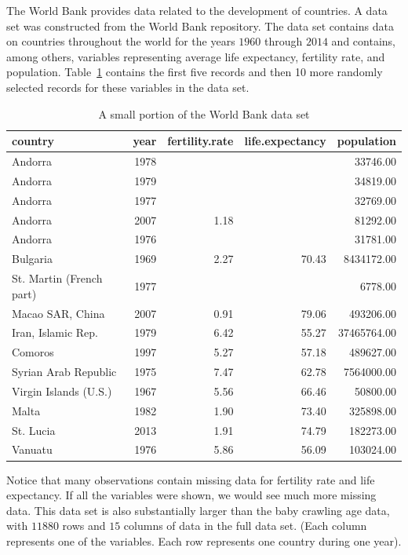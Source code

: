 \documentclass[12pt,oneside]{book}\usepackage[]{graphicx}\usepackage[]{color}
\begin{document}
The World Bank provides data related to the development of countries. A data set was constructed from the World Bank repository. The data set contains data on countries throughout the world for the years $1960$ through $2014$  and contains, among others, variables representing average life expectancy, fertility rate, and population. Table~\ref{TABLE:WORLDBANK} contains the first five records and then 10 more randomly selected records for these variables in the data set.
\begin{table}[ht]
\centering
\begin{tabular}{lrrrr}
  \hline
country & year & fertility.rate & life.expectancy & population \\ 
  \hline
Andorra & 1978 &  &  & 33746.00 \\ 
  Andorra & 1979 &  &  & 34819.00 \\ 
  Andorra & 1977 &  &  & 32769.00 \\ 
  Andorra & 2007 & 1.18 &  & 81292.00 \\ 
  Andorra & 1976 &  &  & 31781.00 \\ 
  Bulgaria & 1969 & 2.27 & 70.43 & 8434172.00 \\ 
  St. Martin (French part) & 1977 &  &  & 6778.00 \\ 
  Macao SAR, China & 2007 & 0.91 & 79.06 & 493206.00 \\ 
  Iran, Islamic Rep. & 1979 & 6.42 & 55.27 & 37465764.00 \\ 
  Comoros & 1997 & 5.27 & 57.18 & 489627.00 \\ 
  Syrian Arab Republic & 1975 & 7.47 & 62.78 & 7564000.00 \\ 
  Virgin Islands (U.S.) & 1967 & 5.56 & 66.46 & 50800.00 \\ 
  Malta & 1982 & 1.90 & 73.40 & 325898.00 \\ 
  St. Lucia & 2013 & 1.91 & 74.79 & 182273.00 \\ 
  Vanuatu & 1976 & 5.86 & 56.09 & 103024.00 \\ 
   \hline
\end{tabular}
\caption{A small portion of the World Bank data set} 
\label{TABLE:WORLDBANK}
\end{table}

Notice that many observations contain missing data for fertility rate and life expectancy. If all the variables were shown, we would see much more missing data.  This data set is also substantially larger than the baby crawling age data, with $11880$ rows and $15$ columns of data in the full data set. (Each column represents one of the variables. Each row represents one country during one year).
\end{document}
